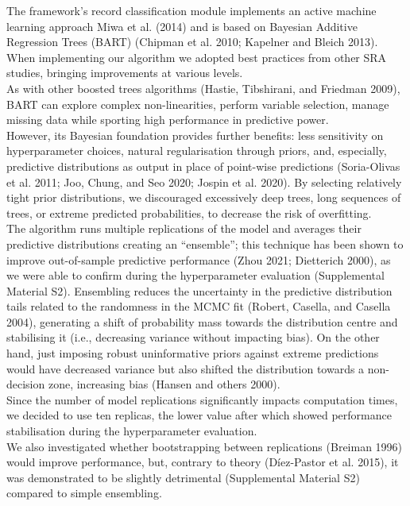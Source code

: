 \documentclass{article}
\begin{document}
The framework's record classification module implements an active
machine learning approach Miwa et al. (2014) and is based on Bayesian
Additive Regression Trees (BART) (Chipman et al. 2010; Kapelner and
Bleich 2013). When implementing our algorithm we adopted best practices
from other SRA studies, bringing improvements at various levels.\\
As with other boosted trees algorithms (Hastie, Tibshirani, and Friedman
2009), BART can explore complex non-linearities, perform variable
selection, manage missing data while sporting high performance in
predictive power.\\
However, its Bayesian foundation provides further benefits: less
sensitivity on hyperparameter choices, natural regularisation through
priors, and, especially, predictive distributions as output in place of
point-wise predictions (Soria-Olivas et al. 2011; Joo, Chung, and Seo
2020; Jospin et al. 2020). By selecting relatively tight prior
distributions, we discouraged excessively deep trees, long sequences of
trees, or extreme predicted probabilities, to decrease the risk of
overfitting.\\
The algorithm runs multiple replications of the model and averages their
predictive distributions creating an ``ensemble''; this technique has
been shown to improve out-of-sample predictive performance (Zhou 2021;
Dietterich 2000), as we were able to confirm during the hyperparameter
evaluation (Supplemental Material S2). Ensembling reduces the
uncertainty in the predictive distribution tails related to the
randomness in the MCMC fit (Robert, Casella, and Casella 2004),
generating a shift of probability mass towards the distribution centre
and stabilising it (i.e., decreasing variance without impacting bias).
On the other hand, just imposing robust uninformative priors against
extreme predictions would have decreased variance but also shifted the
distribution towards a non-decision zone, increasing bias (Hansen and
others 2000).\\
Since the number of model replications significantly impacts computation
times, we decided to use ten replicas, the lower value after which
showed performance stabilisation during the hyperparameter evaluation.\\
We also investigated whether bootstrapping between replications (Breiman
1996) would improve performance, but, contrary to theory (Díez-Pastor et
al. 2015), it was demonstrated to be slightly detrimental (Supplemental
Material S2) compared to simple ensembling.\\
\end{document}
